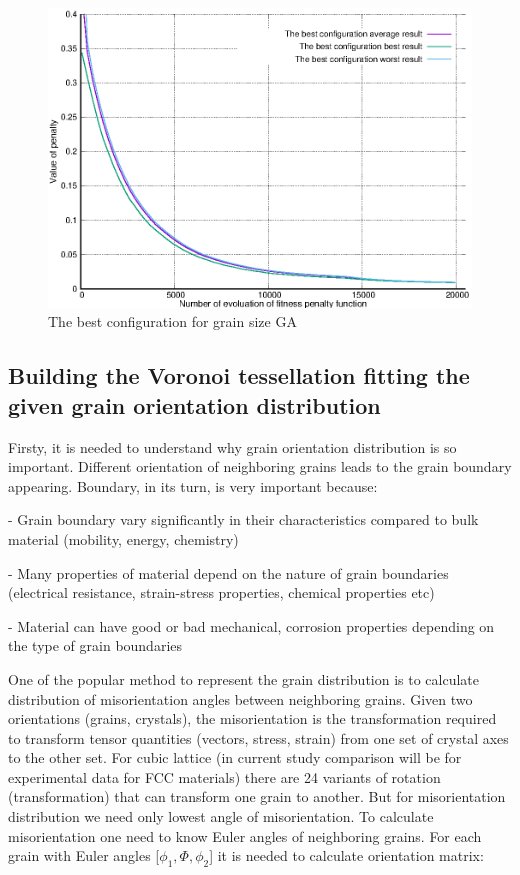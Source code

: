 \documentclass[12pt]{report}
\begin{document}
\begin{figure}
    \centering
    \includegraphics[width=5.0in]{best_config_sizealgo}
    \caption{The best configuration for grain size GA}
    \label{bestconfigsize}
\end{figure}


\subsection{Building the Voronoi tessellation fitting the given grain orientation distribution}

Firsty, it is needed to understand why grain orientation distribution is so important. Different orientation of neighboring grains leads to the grain boundary appearing. Boundary, in its turn, is very important because:

- Grain boundary vary significantly in their characteristics compared to bulk material (mobility, energy, chemistry)

- Many properties of material depend on the nature of grain boundaries (electrical resistance, strain-stress properties, chemical properties etc)

- Material can have good or bad mechanical, corrosion properties depending on the type of grain boundaries
  
One of the popular method to represent the grain distribution is to calculate distribution of misorientation angles between neighboring grains. Given two orientations (grains, crystals), the misorientation is the transformation required to transform tensor quantities (vectors, stress, strain) from one set of crystal axes to the other set. For cubic lattice (in current study comparison will be for experimental data for FCC materials) there are 24 variants of rotation (transformation) that can transform one grain to another. But for misorientation distribution we need only lowest angle of misorientation. To calculate misorientation one need to know Euler angles of neighboring grains. For each grain with Euler angles [$\phi_1, \Phi, \phi_2$] it is needed to calculate orientation matrix:
\end{document}
